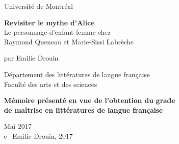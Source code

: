 \sloppy
\begin{titlepage}
  \begin{singlespace}

\begin{center}
{Université de Montréal} \vspace{1.5 cm}\\
\end{center}

\begin{center}
\Large{{\bf{Revisiter le mythe d'Alice}}\\Le personnage d'enfant-femme chez \\Raymond Queneau et Marie-Sissi Labrèche}
\end{center}

\vspace{1.5 cm}

\begin{center}
\normalsize{par Emilie Drouin}
\end{center}

\vspace{1.5 cm}

\begin{center}
Département des littératures de langue française\\
Faculté des arts et des sciences
\end{center}

\vspace{1.5 cm}

\begin{center}
\bf{Mémoire présenté en vue de l'obtention du grade \\ de maîtrise en littératures de langue française}
\end{center}
\vspace{1.5 cm}

\begin{center}
Mai 2017\\
\vspace{3 cm}
{\textcircled{c}}~Emilie Drouin, 2017
\end{center}







\end{singlespace}
\end{titlepage}
